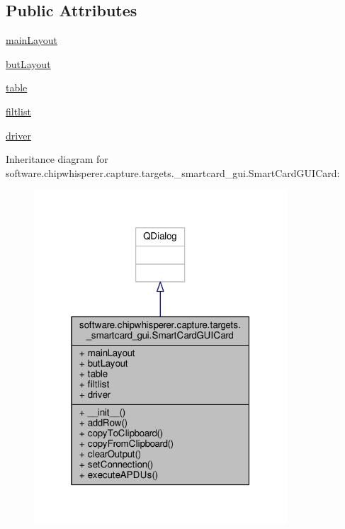 \subsection*{Public Attributes}
\begin{DoxyCompactItemize}
\item 
\hyperlink{classsoftware_1_1chipwhisperer_1_1capture_1_1targets_1_1__smartcard__gui_1_1SmartCardGUICard_a38289fa3967d2704d23c215623b9be3a}{main\+Layout}
\item 
\hyperlink{classsoftware_1_1chipwhisperer_1_1capture_1_1targets_1_1__smartcard__gui_1_1SmartCardGUICard_aa5e6d7eb55be749244108811ec5c2445}{but\+Layout}
\item 
\hyperlink{classsoftware_1_1chipwhisperer_1_1capture_1_1targets_1_1__smartcard__gui_1_1SmartCardGUICard_a7b880ab37bcf33449742c93207300994}{table}
\item 
\hyperlink{classsoftware_1_1chipwhisperer_1_1capture_1_1targets_1_1__smartcard__gui_1_1SmartCardGUICard_a66117a90b2caaf1a0cdcc6026bfc414e}{filtlist}
\item 
\hyperlink{classsoftware_1_1chipwhisperer_1_1capture_1_1targets_1_1__smartcard__gui_1_1SmartCardGUICard_a209baa4e11b395022eb1e803013591c4}{driver}
\end{DoxyCompactItemize}


Inheritance diagram for software.\+chipwhisperer.\+capture.\+targets.\+\_\+smartcard\+\_\+gui.\+Smart\+Card\+G\+U\+I\+Card\+:\nopagebreak
\begin{figure}[H]
\begin{center}
\leavevmode
\includegraphics[width=268pt]{d0/d6e/classsoftware_1_1chipwhisperer_1_1capture_1_1targets_1_1__smartcard__gui_1_1SmartCardGUICard__inherit__graph}
\end{center}
\end{figure}



